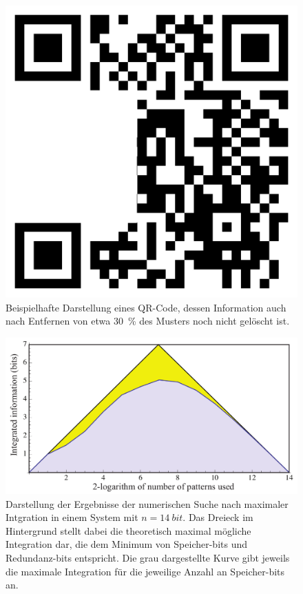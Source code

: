 \begin{figure}
	\centering
	\includegraphics[scale=0.15]{graphics/qrcode_damaged.jpg}
	\caption{Beispielhafte Darstellung eines QR-Code, dessen Information auch nach Entfernen von etwa 
		\SI{30}{\percent} des Musters noch nicht gelöscht ist.\label{fig:neuronqrcode}}
\end{figure}  
\begin{figure}
	\centering
	\includegraphics[scale=0.25]{graphics/integrated_information_graph.jpg}
	\caption{Darstellung der Ergebnisse der numerischen Suche nach maximaler Intgration in einem System 
		mit $n = \SI{14}{bit}$. Das Dreieck im Hintergrund stellt dabei die theoretisch maximal mögliche 
		Integration dar, die dem Minimum von Speicher-bits und Redundanz-bits entspricht. Die grau dargestellte
		Kurve gibt jeweils die maximale Integration für die jeweilige Anzahl an Speicher-bits an. \label{fig:maximal_integrated_information}}
\end{figure}  

